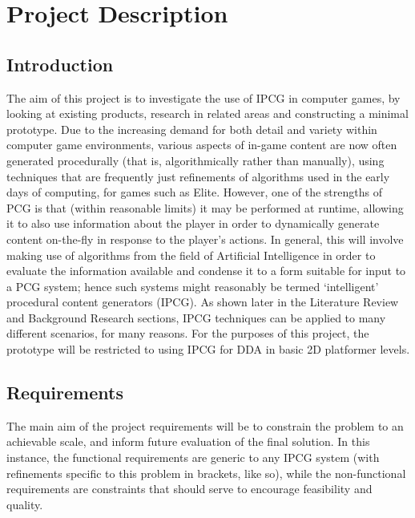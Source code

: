 \documentclass[a4paper,oneside,12pt,openany]{memoir}
\begin{document}
\tableofcontents*
\mainmatter
\chapter{Project Description}
\section{Introduction}
The aim of this project is to investigate the use of IPCG in computer games, by looking at existing products, research in related areas and constructing a minimal prototype. Due to the increasing demand for both detail and variety within computer game environments, various aspects of in-game content are now often generated procedurally (that is, algorithmically rather than manually), using techniques that are frequently just refinements of algorithms used in the early days of computing, for games such as Elite.%
However, one of the strengths of PCG is that (within reasonable limits) it may be performed at runtime, allowing it to also use information about the player in order to dynamically generate content on-the-fly in response to the player's actions. In general, this will involve making use of algorithms from the field of Artificial Intelligence in order to evaluate the information available and condense it to a form suitable for input to a PCG system; hence such systems might reasonably be termed `intelligent' procedural content generators (IPCG).
As shown later in the Literature Review and Background Research sections, IPCG techniques can be applied to many different scenarios, for many reasons. For the purposes of this project, the prototype will be restricted to using IPCG for DDA in basic 2D platformer levels. 
\newpage
\vspace*{1.3cm}
\section{Requirements}
The main aim of the project requirements will be to constrain the problem to an achievable scale, and inform future evaluation of the final solution. In this instance, the functional requirements are generic to any IPCG system (with refinements specific to this problem in brackets, like so), while the non-functional requirements are constraints that should serve to encourage feasibility and quality.
\end{document}
